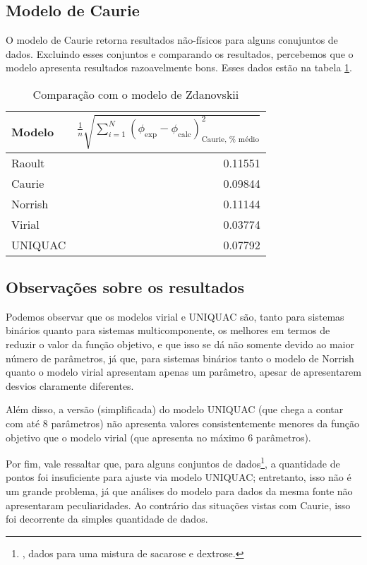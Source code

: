 \documentclass[
	12pt,				%
	openright,
	twoside,
	a4paper,			%
	english,			%
	french,				%
	spanish,			%
	brazil				%
	]{abntex2}
\begin{document}
\subsection{Modelo de Caurie}

O modelo de Caurie retorna resultados não-físicos para alguns conujuntos de dados.
Excluindo esses conjuntos e comparando os resultados, percebemos que o modelo
apresenta resultados razoavelmente bons. Esses dados estão na tabela
\ref{tab_caurie_multi}.

\begin{table}[h]
	\centering
	\caption{Comparação com o modelo de Zdanovskii}
	\label{tab_caurie_multi}
	\bgroup
	\def\arraystretch{1.5}
	\begin{tabular}{l r}\hline
		Modelo & %
			$\frac{1}{n}\sqrt{\sum_{i=1}^N(\phi_{\text{exp}}-%
			\phi_{\text{calc}})^2_\text{Caurie, %
				médio}}$\\\hline
		Raoult & 0.11551 \\
		Caurie & 0.09844 \\
		Norrish & 0.11144 \\
		Virial & 0.03774 \\
		UNIQUAC & 0.07792 \\\hline
	\end{tabular}
	\egroup
\end{table}

\subsection{Observações sobre os resultados}

Podemos observar que os modelos virial e UNIQUAC são, tanto para sistemas
binários quanto para sistemas multicomponente, os melhores em termos de
reduzir o valor da função objetivo, e que isso se dá não somente devido ao maior
número de parâmetros, já que, para sistemas binários tanto o modelo de Norrish
quanto o modelo virial apresentam apenas um parâmetro, apesar de apresentarem desvios
claramente diferentes.

Além disso, a versão (simplificada) do modelo UNIQUAC (que chega a contar com até 8
parâmetros) não apresenta valores consistentemente menores da função objetivo que o
modelo virial (que apresenta no máximo 6 parâmetros).

Por fim, vale ressaltar que, para alguns conjuntos de dados\footnote{%
	\cite{norrish1966}, dados para uma mistura de sacarose e dextrose.
}, a quantidade de pontos foi insuficiente para ajuste via modelo UNIQUAC;
entretanto, isso não é um grande problema, já que análises do modelo para
dados da mesma fonte não apresentaram peculiaridades. Ao contrário das situações
vistas com Caurie, isso foi decorrente da simples quantidade de dados.
\end{document}
